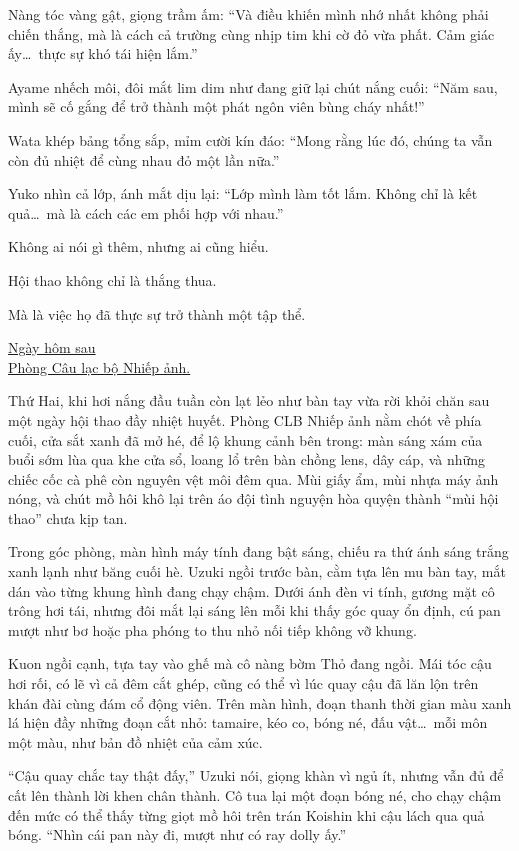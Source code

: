 \documentclass[../main.tex]{subfiles}
\begin{document}
Nàng tóc vàng gật, giọng trầm ấm: ``Và điều khiến mình nhớ nhất không phải chiến thắng, mà là cách cả trường cùng nhịp tim khi cờ đỏ vừa phất. Cảm giác ấy\dots\ thực sự khó tái hiện lắm.''

Ayame nhếch môi, đôi mắt lim dim như đang giữ lại chút nắng cuối: ``Năm sau, mình sẽ cố gắng để trở thành một phát ngôn viên bùng cháy nhất!''

Wata khép bảng tổng sắp, mỉm cười kín đáo: ``Mong rằng lúc đó, chúng ta vẫn còn đủ nhiệt để cùng nhau đỏ một lần nữa.''

Yuko nhìn cả lớp, ánh mắt dịu lại: ``Lớp mình làm tốt lắm. Không chỉ là kết quả\dots\ mà là cách các em phối hợp với nhau.''

Không ai nói gì thêm, nhưng ai cũng hiểu.

Hội thao không chỉ là thắng thua.

Mà là việc họ đã thực sự trở thành một tập thể.

\begin{center}
  \uline{Ngày hôm sau\\Phòng Câu lạc bộ Nhiếp ảnh.}
\end{center}

Thứ Hai, khi hơi nắng đầu tuần còn lạt lẻo như bàn tay vừa rời khỏi chăn sau một ngày hội thao đầy nhiệt huyết. Phòng CLB Nhiếp ảnh nằm chót về phía cuối, cửa sắt xanh đã mở hé, để lộ khung cảnh bên trong: màn sáng xám của buổi sớm lùa qua khe cửa sổ, loang lổ trên bàn chồng lens, dây cáp, và những chiếc cốc cà phê còn nguyên vệt môi đêm qua. Mùi giấy ẩm, mùi nhựa máy ảnh nóng, và chút mồ hôi khô lại trên áo đội tình nguyện hòa quyện thành ``mùi hội thao'' chưa kịp tan.

Trong góc phòng, màn hình máy tính đang bật sáng, chiếu ra thứ ánh sáng trắng xanh lạnh như băng cuối hè. Uzuki ngồi trước bàn, cằm tựa lên mu bàn tay, mắt dán vào từng khung hình đang chạy chậm. Dưới ánh đèn vi tính, gương mặt cô trông hơi tái, nhưng đôi mắt lại sáng lên mỗi khi thấy góc quay ổn định, cú pan mượt như bơ hoặc pha phóng to thu nhỏ nối tiếp không vỡ khung.

Kuon ngồi cạnh, tựa tay vào ghế mà cô nàng bờm Thỏ đang ngồi. Mái tóc cậu hơi rối, có lẽ vì cả đêm cắt ghép, cũng có thể vì lúc quay cậu đã lăn lộn trên khán đài cùng đám cổ động viên. Trên màn hình, đoạn thanh thời gian màu xanh lá hiện đầy những đoạn cắt nhỏ: tamaire, kéo co, bóng né, đấu vật\dots\ mỗi môn một màu, như bản đồ nhiệt của cảm xúc.

``Cậu quay chắc tay thật đấy,'' Uzuki nói, giọng khàn vì ngủ ít, nhưng vẫn đủ để cất lên thành lời khen chân thành. Cô tua lại một đoạn bóng né, cho chạy chậm đến mức có thể thấy từng giọt mồ hôi trên trán Koishin khi cậu lách qua quả bóng. ``Nhìn cái pan này đi, mượt như có ray dolly ấy.''
\end{document}
